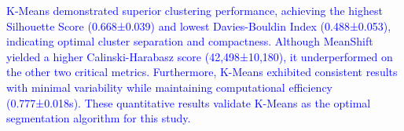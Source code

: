 \documentclass[twocolumn]{article}
\begin{document}
\begin{table}[ht!]
\centering
\caption{Comparison of algorithms for DaTscan segmentation. Each value represents the mean $\pm$ standard deviation.}
\label{tab:segmentation_comparison}

\fontsize{9pt}{10pt}\selectfont
\renewcommand{\arraystretch}{1}
\setlength{\tabcolsep}{3pt}

\end{table}
\textcolor{blue}{
K-Means demonstrated superior clustering performance, achieving the highest Silhouette Score (0.668±0.039) and lowest Davies-Bouldin Index (0.488±0.053), indicating optimal cluster separation and compactness. Although MeanShift yielded a higher Calinski-Harabasz score (42,498±10,180), it underperformed on the other two critical metrics. Furthermore, K-Means exhibited consistent results with minimal variability while maintaining computational efficiency (0.777±0.018s). These quantitative results validate K-Means as the optimal segmentation algorithm for this study.
}






\end{document}
